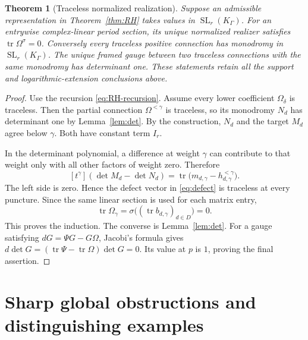 \documentclass[11pt,letterpaper]{article}
\numberwithin{equation}{section}
\newtheorem{theorem}{Theorem}[section]
\theoremstyle{definition}
\theoremstyle{remark}
\newcommand{\tr}{\operatorname{tr}}
\newcommand{\SL}{\operatorname{SL}}
\newcommand{\coeff}[1]{[t^{#1}]}
\newcommand{\K}{K_\Gamma}
\begin{document}
\begin{theorem}[Traceless normalized realization]\label{thm:SL}
Suppose an admissible representation in Theorem~\ref{thm:RH} takes values in
$\SL_r(\K)$. For an entrywise complex-linear period section, its unique
normalized realizer satisfies $\tr\Omega^\sigma=0$. Conversely every
traceless positive connection has monodromy in $\SL_r(\K)$.
The unique framed gauge between two traceless connections with the same
monodromy has determinant one. These statements retain all the support and
logarithmic-extension conclusions above.
\end{theorem}
\begin{proof}
Use the recursion \eqref{eq:RH-recursion}. Assume every lower coefficient
$\Omega_\delta$ is traceless. Then the partial connection
$\Omega^{<\gamma}$ is traceless, so its monodromy $N_d$ has determinant one
by Lemma~\ref{lem:det}. By the construction, $N_d$ and the target $M_d$
agree below $\gamma$. Both have constant term $I_r$.

In the determinant polynomial, a difference at weight $\gamma$ can
contribute to that weight only with all other factors of weight zero.
Therefore
\[
 \coeff{\gamma}(\det M_d-\det N_d)
   =\tr\bigl(m_{d,\gamma}-h_{d,\gamma}^{<\gamma}\bigr).
\]
The left side is zero. Hence the defect vector in \eqref{eq:defect} is
traceless at every puncture. Since the same linear section is used for each
matrix entry,
\[
 \tr\Omega_\gamma
 =\sigma\bigl((\tr b_{d,\gamma})_{d\in D}\bigr)=0.
\]
This proves the induction. The converse is Lemma~\ref{lem:det}.
For a gauge satisfying $dG=\Psi G-G\Omega$, Jacobi's formula gives
$d\det G=(\tr\Psi-\tr\Omega)\det G=0$.
Its value at $p$ is $1$, proving the final assertion.
\end{proof}

\section{Sharp global obstructions and distinguishing examples}
\label{sec:obstructions}
\end{document}
